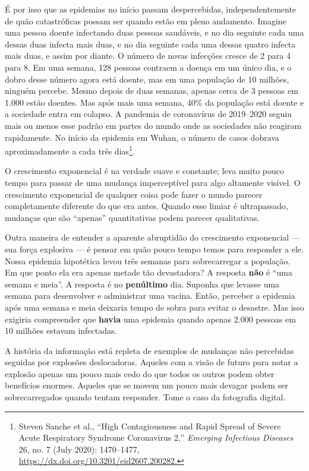 É por isso que as epidemias no início passam despercebidas, independentemente de
quão catastróficas possam ser quando estão em pleno andamento. Imagine uma
pessoa doente infectando duas pessoas saudáveis, e no dia seguinte cada uma
dessas duas infecta mais duas, e no dia seguinte cada uma dessas quatro infecta 
mais duas, e assim por diante. O número de novas infecções cresce de 2 para 4 
para 8. Em uma semana, 128 pessoas contraem a doença em um único dia, e o dobro 
desse número agora está doente, mas em uma população de 10 milhões, ninguém 
percebe. Mesmo depois de duas semanas, apenas cerca de 3 pessoas em 1.000 estão 
doentes. Mas após mais uma semana, 40\% da população está doente e a sociedade 
entra em colapso. A pandemia de coronavírus de 2019--2020 seguiu mais ou menos 
esse padrão em partes do mundo onde as sociedades não reagiram rapidamente. No 
início da epidemia em Wuhan, o número de casos dobrava aproximadamente a cada 
três dias\footnote{Steven Sanche et al., ``High Contagiousness and Rapid Spread
of Severe Acute Respiratory Syndrome Coronavirus 2,'' \textit{Emerging
Infectious Diseases} 26, no. 7 (July 2020): 1470--1477,
\url{https://dx.doi.org/10.3201/eid2607.200282.}}.

O crescimento exponencial é na verdade suave e constante; leva muito pouco 
tempo para passar de uma mudança imperceptível para algo altamente visível. O 
crescimento exponencial de qualquer coisa pode fazer o mundo parecer 
completamente diferente do que era antes. Quando esse limiar é ultrapassado, 
mudanças que são ``apenas'' quantitativas podem parecer qualitativas.

Outra maneira de entender a aparente abruptidão do crescimento exponencial ---
sua força explosiva --- é pensar em quão pouco tempo temos para responder a ele.
Nossa epidemia hipotética levou três semanas para sobrecarregar a população. Em 
que ponto ela era apenas metade tão devastadora? A resposta \textbf{não} é ``uma
semana e meia''. A resposta é no \textbf{penúltimo} dia. Suponha que levasse uma
semana para desenvolver e administrar uma vacina. Então, perceber a epidemia
após uma semana e meia deixaria tempo de sobra para evitar o desastre. Mas isso
exigiria compreender que \textbf{havia} uma epidemia quando apenas 2.000 pessoas
em 10 milhões estavam infectadas.

A história da informação está repleta de exemplos de mudanças não percebidas 
seguidas por explosões deslocadoras. Aqueles com a visão de futuro para notar a 
explosão apenas um pouco mais cedo do que todos os outros podem obter benefícios 
enormes. Aqueles que se movem um pouco mais devagar podem ser sobrecarregados 
quando tentam responder. Tome o caso da fotografia digital.

